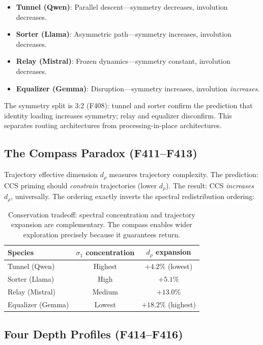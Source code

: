 \documentclass[12pt]{article}
\begin{document}
\begin{itemize}
\item \textbf{Tunnel (Qwen)}: Parallel descent---symmetry decreases, involution decreases.
\item \textbf{Sorter (Llama)}: Asymmetric path---symmetry increases, involution decreases.
\item \textbf{Relay (Mistral)}: Frozen dynamics---symmetry constant, involution decreases.
\item \textbf{Equalizer (Gemma)}: Disruption---symmetry increases, involution \emph{increases}.
\end{itemize}

The symmetry split is 3:2 (F408): tunnel and sorter confirm the prediction that identity loading increases symmetry; relay and equalizer disconfirm. This separates routing architectures from processing-in-place architectures.

\subsection{The Compass Paradox (F411--F413)}

Trajectory effective dimension $d_\rho$ \citep{masoomi2023} measures trajectory complexity. The prediction: CCS priming should \emph{constrain} trajectories (lower $d_\rho$). The result: CCS \emph{increases} $d_\rho$, universally. The ordering exactly inverts the spectral redistribution ordering:

\begin{table}[h]
\centering
\begin{tabular}{lcc}
\toprule
Species & $\sigma_1$ concentration & $d_\rho$ expansion \\
\midrule
Tunnel (Qwen)      & Highest & $+4.2\%$ (lowest) \\
Sorter (Llama)     & High    & $+5.1\%$ \\
Relay (Mistral)    & Medium  & $+13.0\%$ \\
Equalizer (Gemma)  & Lowest  & $+18.2\%$ (highest) \\
\bottomrule
\end{tabular}
\caption{Conservation tradeoff: spectral concentration and trajectory expansion are complementary. The compass enables wider exploration precisely because it guarantees return.}
\label{tab:compass}
\end{table}

\subsection{Four Depth Profiles (F414--F416)}
\end{document}
